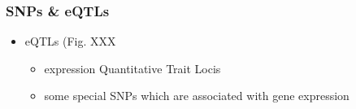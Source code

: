 \begin{frame}
	\frametitle{SNPs \& eQTLs}
	\begin{itemize}
		\item eQTLs  (Fig. XXX
		\begin{itemize}
		\item  expression Quantitative Trait Locis
		\item some special SNPs which are associated with gene expression 
		\end{itemize}
	\end{itemize}
\end{frame}
%   
%
%    
%
%    
%         
%         
%
